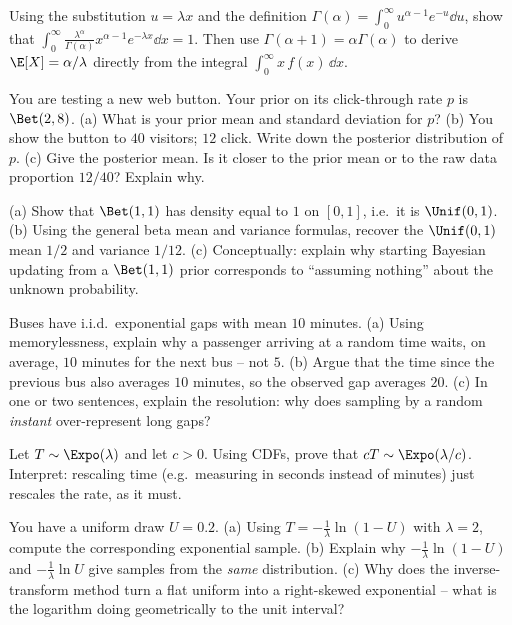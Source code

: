 \begin{exercise}
\label{ch11:exr-gammaconst}
Using the substitution $u=\lambda x$ and the definition
$\Gamma(\alpha)=\int_0^\infty u^{\alpha-1}e^{-u}\dd u$, show that
$\int_0^\infty \frac{\lambda^\alpha}{\Gamma(\alpha)} x^{\alpha-1}e^{-\lambda x}\dd x = 1$.
Then use $\Gamma(\alpha+1)=\alpha\Gamma(\alpha)$ to derive $\E[X]=\alpha/\lambda$
directly from the integral $\int_0^\infty x\,f(x)\,\dd x$.
\end{exercise}

\begin{exercise}
\label{ch11:exr-beta}
You are testing a new web button. Your prior on its click-through rate $p$ is
$\Bet(2,8)$. (a) What is your prior mean and standard deviation for $p$? (b) You
show the button to $40$ visitors; $12$ click. Write down the posterior
distribution of $p$. (c) Give the posterior mean. Is it closer to the prior mean
or to the raw data proportion $12/40$? Explain why.
\end{exercise}

\begin{exercise}
\label{ch11:exr-unifbeta}
(a) Show that $\Bet(1,1)$ has density equal to $1$ on $[0,1]$, i.e.\ it is
$\Unif(0,1)$. (b) Using the general beta mean and variance formulas, recover the
$\Unif(0,1)$ mean $1/2$ and variance $1/12$. (c) Conceptually: explain why
starting Bayesian updating from a $\Bet(1,1)$ prior corresponds to ``assuming
nothing'' about the unknown probability.
\end{exercise}

\begin{exercise}
\label{ch11:exr-paradox}
Buses have i.i.d.\ exponential gaps with mean $10$ minutes. (a) Using
memorylessness, explain why a passenger arriving at a random time waits, on
average, $10$ minutes for the next bus -- not $5$. (b) Argue that the time since
the previous bus also averages $10$ minutes, so the observed gap averages $20$.
(c) In one or two sentences, explain the resolution: why does sampling by a
random \emph{instant} over-represent long gaps?
\end{exercise}

\begin{exercise}
\label{ch11:exr-scale}
Let $T\sim\Expo(\lambda)$ and let $c>0$. Using CDFs, prove that
$cT\sim\Expo(\lambda/c)$. Interpret: rescaling time (e.g.\ measuring in seconds
instead of minutes) just rescales the rate, as it must.
\end{exercise}

\begin{exercise}
\label{ch11:exr-invtransform}
You have a uniform draw $U=0.2$. (a) Using $T=-\tfrac{1}{\lambda}\ln(1-U)$ with
$\lambda=2$, compute the corresponding exponential sample. (b) Explain why
$-\tfrac{1}{\lambda}\ln(1-U)$ and $-\tfrac{1}{\lambda}\ln U$ give samples from
the \emph{same} distribution. (c) Why does the inverse-transform method turn a
flat uniform into a right-skewed exponential -- what is the logarithm doing
geometrically to the unit interval?
\end{exercise}
